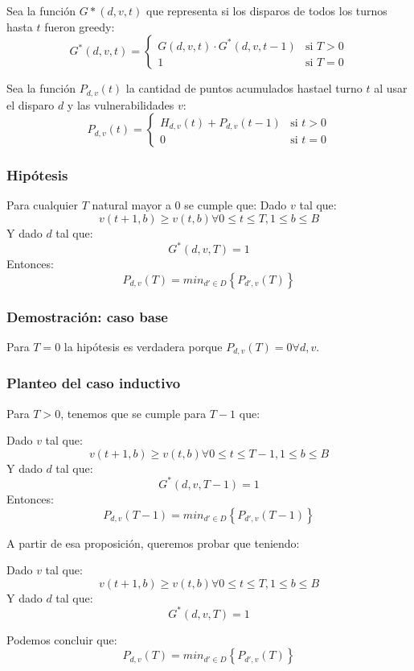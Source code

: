 \documentclass{article}
\begin{document}
Sea la función $G*(d,v,t)$ que representa si los disparos de todos los turnos hasta $t$ fueron greedy:
\[
    G^*(d,v,t)=
    \begin{cases}
        G(d,v,t) \cdot G^*(d,v,t-1) & \text{si $T>0$} \\
        1 & \text{si $T=0$}
    \end{cases}
\]

Sea la función $P_{d,v}(t)$ la cantidad de puntos acumulados hastael turno $t$ al usar el disparo $d$ y las vulnerabilidades $v$:
\[
    P_{d,v}(t)=
    \begin{cases}
        H_{d,v}(t) + P_{d,v}(t-1) & \text{si $t>0$} \\
        0 & \text{si $t=0$}
    \end{cases}
\]


\subsubsection{Hipótesis}
\begin{framed}
Para cualquier $T$ natural mayor a 0 se cumple que: \newline
Dado $v$ tal que: 
$$ v(t+1,b) 
\geq 
v(t,b) \forall 0 \leq t \leq T, 1 \leq b \leq B $$
Y dado $d$ tal que: $$G^*(d,v,T)=1$$
Entonces: $$P_{d,v}(T)=min_{d' \in D} \left \{ P_{d',v}(T) \right \}$$
\end{framed}

\subsubsection{Demostración: caso base}
Para $T=0$ la hipótesis es verdadera porque $P_{d,v}(T)=0 \forall d,v$.


\subsubsection{Planteo del caso inductivo}
Para $T > 0$, tenemos que se cumple para $T-1$ que:
\begin{framed}
Dado $v$ tal que: $$ v(t+1,b) \geq v(t,b) \forall 0 \leq t \leq T-1, 1 \leq b \leq B $$
Y dado $d$ tal que: $$G^*(d,v,T-1)=1$$
Entonces: $$P_{d,v}(T-1)=min_{d' \in D} \left \{ P_{d',v}(T-1) \right \}$$
\end{framed}
A partir de esa proposición, queremos probar que teniendo:
\begin{framed}
Dado $v$ tal que: $$ v(t+1,b) \geq v(t,b) \forall 0 \leq t \leq T, 1 \leq b \leq B $$
Y dado $d$ tal que: $$G^*(d,v,T)=1$$
\end{framed}
Podemos concluir que: $$P_{d,v}(T)=min_{d' \in D} \left \{ P_{d',v}(T) \right \}$$
\end{document}

